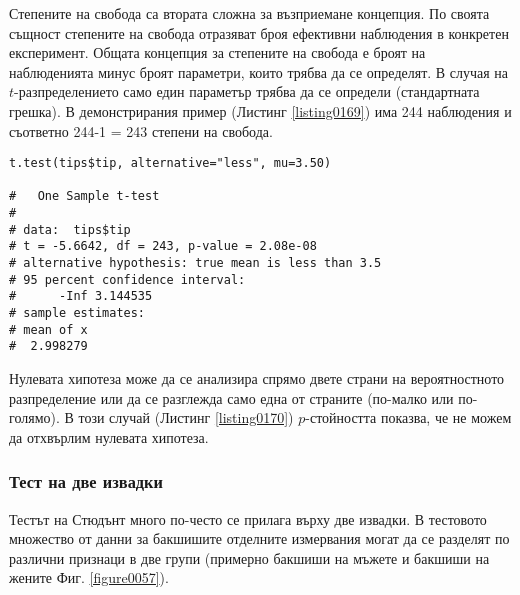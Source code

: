 Степените на свобода са втората сложна за възприемане концепция. По своята същност степените на свобода отразяват броя ефективни наблюдения в конкретен експеримент. Общата концепция за степените на свобода е броят на наблюденията минус броят параметри, които трябва да се определят. В случая на $t$-разпределението само един параметър трябва да се определи (стандартната грешка). В демонстрирания пример (Листинг \ref{listing0169}) има 244 наблюдения и съответно 244-1 = 243 степени на свобода. 

\begin{lstlisting}[caption=Едностранна t-статистика, label=listing0170]
t.test(tips$tip, alternative="less", mu=3.50)

# 	One Sample t-test
# 
# data:  tips$tip
# t = -5.6642, df = 243, p-value = 2.08e-08
# alternative hypothesis: true mean is less than 3.5
# 95 percent confidence interval:
#      -Inf 3.144535
# sample estimates:
# mean of x 
#  2.998279 
\end{lstlisting}

Нулевата хипотеза може да се анализира спрямо двете страни на вероятностното разпределение или да се разглежда само една от страните (по-малко или по-голямо). В този случай (Листинг \ref{listing0170}) $p$-стойността показва, че не можем да отхвърлим нулевата хипотеза. 

\subsubsection{Тест на две извадки}

Тестът на Стюдънт много по-често се прилага върху две извадки. В тестовото множество от данни за бакшишите отделните измервания могат да се разделят по различни признаци в две групи (примерно бакшиши на мъжете и бакшиши на жените Фиг. \ref{figure0057}).

